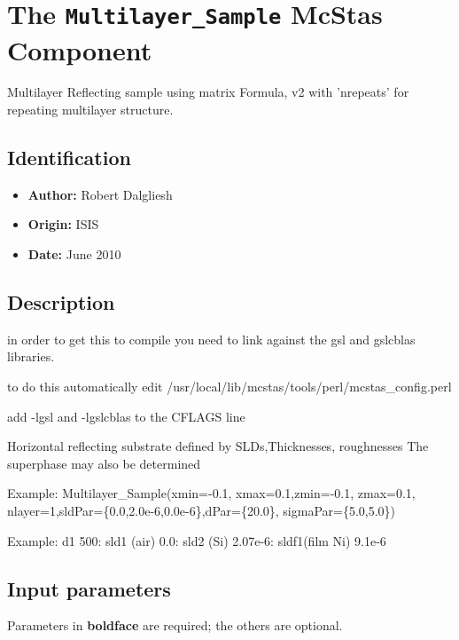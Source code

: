 \section{The \texttt{Multilayer\_Sample} McStas Component}
Multilayer Reflecting sample using matrix Formula, v2 with 'nrepeats' for repeating multilayer structure.

\subsection*{Identification}
\begin{itemize}
  \item \textbf{Author:} Robert Dalgliesh
  \item \textbf{Origin:} ISIS
  \item \textbf{Date:} June 2010
\end{itemize}

\subsection*{Description}
in order to get this to compile you need to link against the gsl and gslcblas libraries.

to do this automatically edit /usr/local/lib/mcstas/tools/perl/mcstas\_config.perl

add -lgsl and -lgslcblas to the CFLAGS line

Horizontal reflecting substrate defined by SLDs,Thicknesses, roughnesses The superphase may also be determined

Example: Multilayer\_Sample(xmin=-0.1, xmax=0.1,zmin=-0.1, zmax=0.1, nlayer=1,sldPar=\{0.0,2.0e-6,0.0e-6\},dPar=\{20.0\}, sigmaPar=\{5.0,5.0\})

Example: d1 500: sld1 (air) 0.0: sld2 (Si) 2.07e-6: sldf1(film Ni) 9.1e-6

\subsection*{Input parameters}
Parameters in \textbf{boldface} are required; the others are optional.


